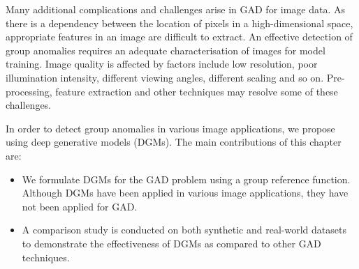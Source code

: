  Many additional complications and challenges arise in GAD for image data.
 As there is a dependency between the location of pixels in a high-dimensional space, appropriate features in an image are difficult to extract. An effective detection of group anomalies requires an adequate characterisation of images for model training.   Image quality is affected by factors include low resolution, poor illumination intensity, different viewing angles, different scaling and so on. %
 Pre-processing, feature extraction and other techniques may resolve some of these challenges.


In order to detect  group anomalies in various image applications, we propose using  deep generative models (DGMs).
The main contributions of this chapter are: %
\begin{itemize}
\item We formulate DGMs for the GAD problem  using a group reference function.   Although DGMs have been applied in various image applications, they have not been applied for GAD. %
\item  A comparison study is conducted  on both  synthetic and real-world datasets to demonstrate the effectiveness of  DGMs as compared to other GAD techniques. %
\vspace{1mm}
\end{itemize}


\begin{comment}
Figure~\ref{mse} shows the output of using a robust and deep autoencoder
to recover images. The data set consists of images of dogs where each
image has been corrupted with a small amount of noise. The proposed
autoencoder is able to reconstruct the dog images but fails to
properly reconstruct an image which has a dog and a boy. In fact,
the image of the dog with the boy was discovered as part of the
anomaly detection process using autoencoders.
\begin{figure}[!t]
	\centering
	\texttt{[image: otherClass]}
	\caption{Illustration of the  anomaly detection capability of deep inductive convolutional autoencoders.
		The data set consists of ``dog'' images (first column).
		Our proposed robust autoencoder decomposes an image $\X = \hat{\X} + \N$.
		The $\hat{\X}$ (second column) shows the reconstructed image and $\N$ (third column) shows the difference between the original and the reconstructed image.
		In the first row, a dog image is normal, while in the second row, an image of a flight  (an anomaly) is  reconstructed with high mean square error.}
	\label{mse}
	\vspace{-\baselineskip}
\end{figure}
\end{comment}

